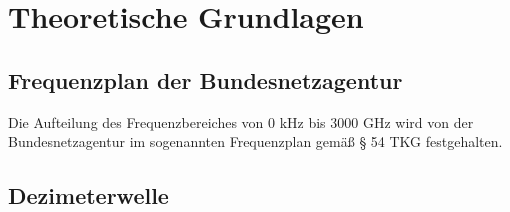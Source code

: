 
\chapter{Theoretische Grundlagen}
\section{Frequenzplan der Bundesnetzagentur}
Die Aufteilung des Frequenzbereiches von 0 kHz bis 3000 GHz wird von der Bundesnetzagentur im sogenannten Frequenzplan \cite[Bundesnetzagentur]{bundesnetzagentur-frequenzplan:2016} gemäß § 54 TKG festgehalten.
\section{Dezimeterwelle}


